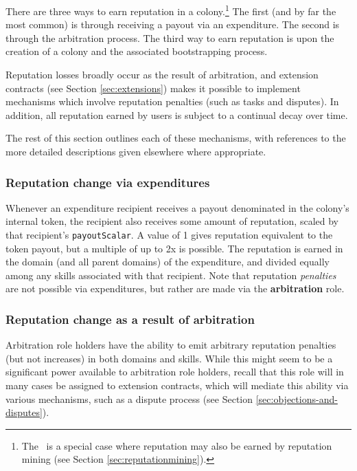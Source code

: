 There are three ways to earn reputation in a colony.\footnote{The \rc\ is a special case where reputation may also be earned by reputation mining (see Section \ref{sec:reputationmining}).} The first (and by far the most common) is through receiving a payout via an expenditure. The second is through the arbitration process. The third way to earn reputation is upon the creation of a colony and the associated bootstrapping process.

Reputation losses broadly occur as the result of arbitration, and extension contracts (see Section \ref{sec:extensions}) makes it possible to implement mechanisms which involve reputation penalties (such as tasks and disputes). In addition, all reputation earned by users is subject to a continual decay over time.

The rest of this section outlines each of these mechanisms, with references to the more detailed descriptions given elsewhere where appropriate.

\subsubsection*{Reputation change via expenditures}

Whenever an expenditure recipient receives a payout denominated in the colony's internal token, the recipient also receives some amount of reputation, scaled by that recipient's \texttt{payoutScalar}. A value of 1 gives reputation equivalent to the token payout, but a multiple of up to 2x is possible. The reputation is earned in the domain (and all parent domains) of the expenditure, and divided equally among any skills associated with that recipient. Note that reputation \textit{penalties} are not possible via expenditures, but rather are made via the \textbf{arbitration} role.

\subsubsection*{Reputation change as a result of arbitration}\label{sec:earning-rep-in-disputes}

Arbitration role holders have the ability to emit arbitrary reputation penalties (but not increases) in both domains and skills. While this might seem to be a significant power available to arbitration role holders, recall that this role will in many cases be assigned to extension contracts, which will mediate this ability via various mechanisms, such as a dispute process (see Section \ref{sec:objections-and-disputes}).

